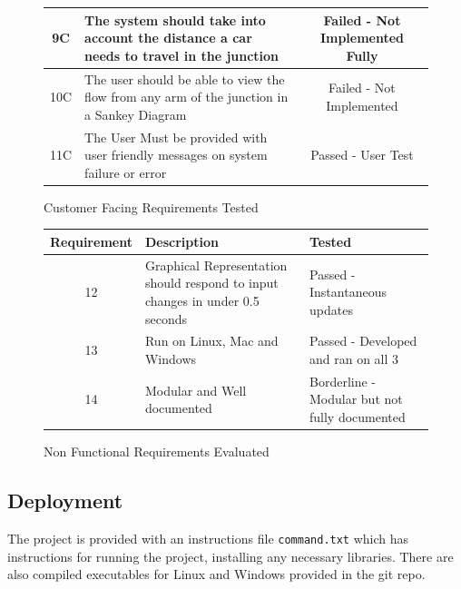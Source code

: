 \documentclass{article}
\begin{document}
\begin{figure}[H]
\begin{center}
\begin{tabular}{ |c|p{9cm}|c| }
                \hline
                9C          & The system should take into account the distance a car needs to travel in the junction & Failed - Not Implemented Fully \\
                \hline
                10C         & The user should be able to view the flow from any arm of the junction in a Sankey Diagram & Failed - Not Implemented \\
                \hline
                11C         & The User Must be provided with user friendly messages on system failure or error & Passed - User Test \\
                \hline
            \end{tabular}
            \caption{Customer Facing Requirements Tested}
        \end{center}\label{fig:figure}
    \end{figure}

    \begin{figure}[H]
        \begin{center}
            \begin{tabular}{ |c|p{9cm}|p{5cm}| }
                \hline
                Requirement & Description & Tested \\
                \hline
                12 & Graphical Representation should respond to input changes in under 0.5 seconds & Passed - Instantaneous updates \\
                \hline
                13 & Run on Linux, Mac and Windows & Passed - Developed and ran on all 3 \\
                \hline
                14 & Modular and Well documented & Borderline - Modular but not fully documented \\
                \hline
            \end{tabular}
            \caption{Non Functional Requirements Evaluated}
        \end{center}\label{fig:figure2k}
    \end{figure}

    \subsection{Deployment}

    The project is provided with an instructions file \texttt{command.txt} which has instructions for running the
    project, installing any necessary libraries.
    There are also compiled executables for Linux and Windows provided in the git repo.
\end{document}
